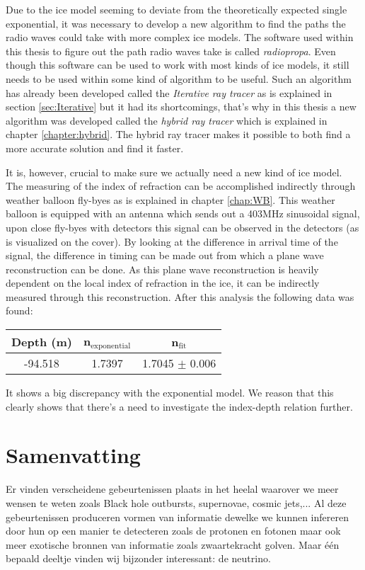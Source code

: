 Due to the ice model seeming to deviate from the theoretically expected single
exponential, it was necessary to develop a new algorithm to find the paths the
radio waves could take with more complex ice models.  The software used within
this thesis to figure out the path radio waves take is called
\textit{radiopropa}.  Even though this software can be used to work with most
kinds of ice models, it still needs to be used within some kind of algorithm to
be useful. Such an algorithm has already been developed called the
\textit{Iterative ray tracer} as is explained in section \ref{sec:Iterative}
but it had its shortcomings, that's why in this thesis a new algorithm was
developed called the \textit{hybrid ray tracer} which is explained in chapter
\ref{chapter:hybrid}. The hybrid ray tracer makes it possible to both find a
more accurate solution and find it faster.

It is, however, crucial to make sure we actually need a new kind of ice model.
The measuring of the index of refraction can be accomplished indirectly through
weather balloon fly-byes as is explained in chapter \ref{chap:WB}. 
This weather balloon is equipped with an antenna which sends out a 403MHz
sinusoidal signal, upon close fly-byes with detectors this signal can be
observed in the detectors (as is visualized on the cover). By looking at the
difference in arrival time of the signal, the difference in timing can be made
out from which a plane wave reconstruction can be done. As this plane wave
reconstruction is heavily dependent on the local index of refraction in the
ice, it can be indirectly measured through this reconstruction.  After this
analysis the following data was found:
\begin{center}
\begin{tabular}{||c c c||}
 \hline
 Depth (m) & n$_\text{exponential}$ & n$_\text{fit}$\\ [0.5ex]
 \hline\hline
 -94.518 & 1.7397 & 1.7045 $\pm$ 0.006 \\
 \hline
\end{tabular}
\end{center}
It shows a big discrepancy with the exponential model.
We reason that this clearly shows that there's a need to investigate
the index-depth relation further.
\newpage
\chapter*{Samenvatting}
Er vinden verscheidene gebeurtenissen plaats in het heelal waarover we
meer wensen te weten zoals Black hole outbursts, supernovae, cosmic jets,...
Al deze gebeurtenissen produceren vormen van informatie dewelke we kunnen
infereren door hun op een manier te detecteren zoals de protonen en fotonen
maar ook meer exotische bronnen van informatie zoals zwaartekracht golven.
Maar één bepaald deeltje vinden wij bijzonder interessant: de neutrino.

